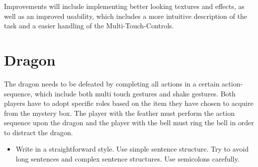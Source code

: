 \documentclass{sigchi-ext}
\begin{document}
Improvements will include implementing better looking textures and effects, as well as an improved usability, which includes a more intuitive description of the task and a easier handling of the Multi-Touch-Controls.

\section{Dragon}

The dragon needs to be defeated by completing all actions in a certain action-sequence, which include both multi touch gestures and shake gestures. Both players have to adopt specific roles based on the item they have chosen to acquire from the mystery box. The player with the feather must perform the action sequence upon the dragon and the player with the bell must ring the bell in order to distract the dragon. 



\begin{itemize}\compresslist%
\item Write in a straightforward style. Use simple sentence
  structure. Try to avoid long sentences and complex sentence
  structures. Use semicolons carefully.

\end{itemize}




\balance{} 



\end{document}
